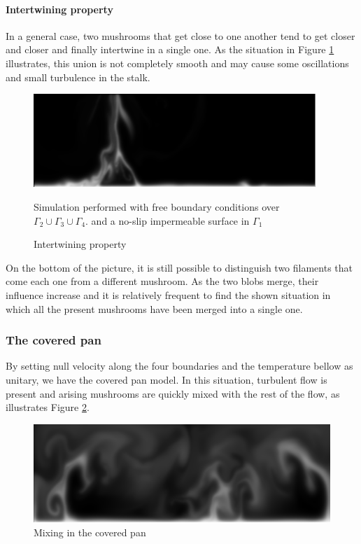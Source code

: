 \documentclass[12pt,oneside]{article}
\begin{document}
\paragraph{Intertwining property}
In a general case, two mushrooms that get close to one another tend to get closer and closer and finally intertwine in a single one. As the situation in Figure \ref{fig:intert} illustrates, this union is not completely smooth and may cause some oscillations and small turbulence in the stalk.

\begin{figure}[ht]
 \centering
 \includegraphics[width=0.95\textwidth]{06_0030t.png}
 \caption{Intertwining property}
 \label{fig:intert}
 \footnotesize{Simulation performed with free boundary conditions over $\Gamma_2 \cup \Gamma_3 \cup \Gamma_4$. and a no-slip impermeable surface in $\Gamma_1$}
\end{figure}

On the bottom of the picture, it is still possible to distinguish two filaments that come each one from a different mushroom. As the two blobs merge, their influence increase and it is relatively frequent to find the shown situation in which all the present mushrooms have been merged into a single one.

\subsubsection{The covered pan}
By setting null velocity along the four boundaries and the temperature bellow as unitary, we have the covered pan model. In this situation, turbulent flow is present and arising mushrooms are quickly mixed with the rest of the flow, as illustrates Figure \ref{fig:covpan}.

\begin{figure}[ht]
  \centering
  \includegraphics[width=.95\textwidth]{covpan2.png}
  \caption{Mixing in the covered pan}\label{fig:covpan}
\end{figure}
\end{document}
